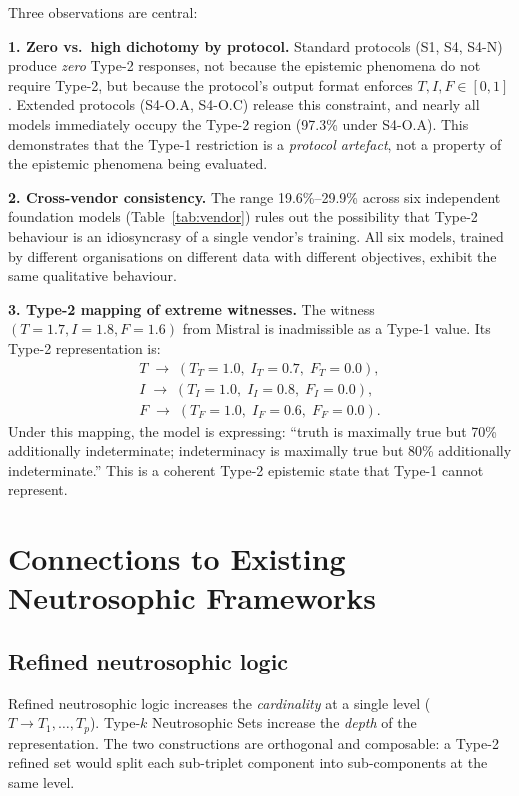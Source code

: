 \documentclass[10pt,a4paper]{article}
\begin{document}
Three observations are central:

\textbf{1. Zero vs.\ high dichotomy by protocol.}
Standard protocols (S1, S4, S4-N) produce \emph{zero}
Type-2 responses, not because the epistemic phenomena
do not require Type-2, but because the protocol's
output format enforces $T, I, F \in [0,1]$.
Extended protocols (S4-O.A, S4-O.C) release this
constraint, and nearly all models immediately occupy
the Type-2 region (97.3\% under S4-O.A).
This demonstrates that the Type-1 restriction is a
\emph{protocol artefact}, not a property of the
epistemic phenomena being evaluated.

\textbf{2. Cross-vendor consistency.}
The range 19.6\%--29.9\% across six independent
foundation models (Table~\ref{tab:vendor}) rules out
the possibility that Type-2 behaviour is an idiosyncrasy
of a single vendor's training. All six models, trained
by different organisations on different data with
different objectives, exhibit the same qualitative
behaviour.

\textbf{3. Type-2 mapping of extreme witnesses.}
The witness $(T=1.7, I=1.8, F=1.6)$ from Mistral
is inadmissible as a Type-1 value. Its Type-2
representation is:
\begin{align}
  T \;\to\; (T_T=1.0,\; I_T=0.7,\; F_T=0.0), \nonumber\\
  I \;\to\; (T_I=1.0,\; I_I=0.8,\; F_I=0.0), \nonumber\\
  F \;\to\; (T_F=1.0,\; I_F=0.6,\; F_F=0.0). \nonumber
\end{align}
Under this mapping, the model is expressing:
``truth is maximally true but 70\% additionally
indeterminate; indeterminacy is maximally true but
80\% additionally indeterminate.'' This is a coherent
Type-2 epistemic state that Type-1 cannot represent.

\section{Connections to Existing Neutrosophic Frameworks}

\subsection{Refined neutrosophic logic}

Refined neutrosophic logic \cite{smarandache2013refined}
increases the \emph{cardinality} at a single level
($T \to T_1, \ldots, T_p$).
Type-$k$ Neutrosophic Sets increase the \emph{depth}
of the representation.
The two constructions are orthogonal and composable:
a Type-2 refined set would split each sub-triplet
component into sub-components at the same level.
\end{document}
